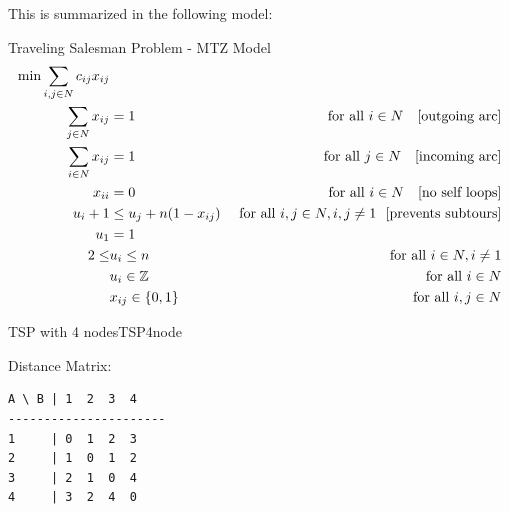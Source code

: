 This is summarized in the following model:
\begin{general}{Traveling Salesman Problem - MTZ Model}{}
\begin{align}
\min \sum_{i,j \in N} c_{ij} x_{ij}\\
\sum_{j\in N} x_{ij} &= 1 & \mbox{ for all } i \in N \ \ \mbox{ [outgoing arc]}\\
\sum_{i \in N} x_{ij} &= 1 & \mbox{ for all } j \in N \ \ \mbox{ [incoming arc]}\\
x_{ii} &= 0 & \mbox{ for all } i \in N \ \ \mbox{ [no self loops]} \\
u_i + 1 & \leq u_j + n(1-x_{ij})  & \mbox{ for all } i,j \in N, i,j \neq 1 \ \ \mbox{[prevents subtours]}\\
u_1 &= 1\\
2 \leq & u_i \leq n & \mbox{ for all } i \in N, i \neq 1\\
& u_i \in {\mathbb{Z}} & \mbox{ for all } i \in N\\
& x_{ij} \in \{0,1\} & \mbox{ for all } i,j \in N
\end{align}
\end{general}


\begin{example}{TSP with 4 nodes}{TSP4node}

Distance Matrix:
\begin{verbatim}
A \ B | 1  2  3  4
----------------------
1     | 0  1  2  3
2     | 1  0  1  2
3     | 2  1  0  4
4     | 3  2  4  0
\end{verbatim}
\end{example}

